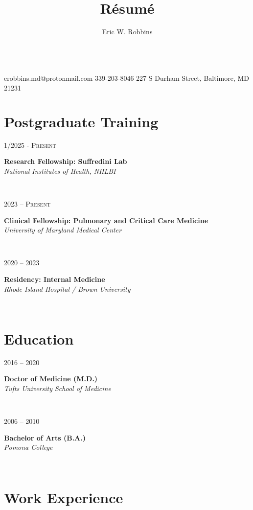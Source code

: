 \documentclass{article}
\title{R\'esum\'e}
\author{Eric W. Robbins}
\date{}
\makeatletter
\newcommand\colleft{.20}
\newcommand\colright{.75}
\newcommand\mohan{Mohan Thanikachalam, MD}
\newcommand{\entryfour}[4]
	{
		\begin{minipage}[t]{\colleft\textwidth}
		\hfill \textsc{#1}
		\end{minipage}
		\hfill\vline\hfill
		\begin{minipage}[t]{\colright\textwidth}
		{\bf#2}\\
		\textit{#3}
		\footnotesize{#4}
		\end{minipage}\\
		\entryvspace
	}%
\newcommand{\entryvspace}{\vspace{0.5em}}
\newcommand{\fellowshipClinical}{University of Maryland Medical Center}
\newcommand{\fellowshipResearch}{National Institutes of Health, NHLBI}
\newcommand{\residency}{Rhode Island Hospital / Brown University}
\newcommand{\medschool}{Tufts University School of Medicine}
\newcommand{\undergrad}{Pomona College}
\newcommand{\cphone}{339-203-8046}
\newcommand{\address}{227 S Durham Street, Baltimore, MD 21231}
\newcommand{\email}{erobbins.md@protonmail.com}
\renewcommand{\maketitle}{
\begin{center}
	{\huge\bfseries\theauthor}
	\vspace{0.25em}\\
	\email
	\hspace{1em}\vline \hspace{1em}%
	\cphone
	\hspace{1em}\vline \hspace{1em}
	\address
\end{center}
}
\makeatother
\begin{document}
	\maketitle
	
		\section*{Postgraduate Training}
	\entryfour{1/2025 - Present}
	{Research Fellowship: Suffredini Lab}
	{\fellowshipResearch}
	{}
		
	\entryfour{2023 -- Present}
	{Clinical Fellowship: Pulmonary and Critical Care Medicine}
	{\fellowshipClinical}
	{}
	
	\entryfour{2020 -- 2023}
	{Residency: Internal Medicine}
	{\residency}
	{}
	
	\section*{Education}
		\entryfour{2016 -- 2020}
			{Doctor of Medicine (M.D.)}
			{\medschool}
			{}%
			
		\entryfour{2006 -- 2010}
		{Bachelor of Arts (B.A.)}
		{\undergrad}
		{}%

	\section*{Work Experience}

		
\end{document}
